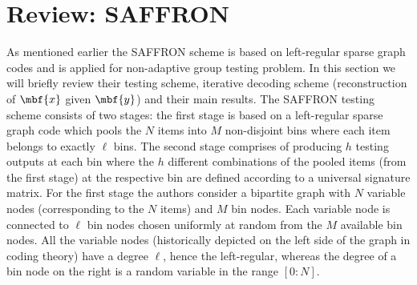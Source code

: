 \documentclass[conference,twocolumn]{IEEEtran}
\DeclareMathOperator*{\bigORtxt}{\scalerel*{\text{$\vee$}}{\textstyle\sum}}
\begin{document}
%

\section{Review: SAFFRON}
\label{Sec:PriorWork}
As mentioned earlier the SAFFRON scheme \cite{lee2015saffron} is based on left-regular sparse graph codes and is applied for non-adaptive group testing problem. In this section we will briefly review their testing scheme, iterative decoding scheme (reconstruction of $\mbf{x}$ given $\mbf{y}$) and their main results. The SAFFRON testing scheme consists of two stages: the first stage is based on a left-regular sparse graph code which pools the $N$ items into $M$ non-disjoint bins where each item belongs to exactly $\ell$ bins. The second stage comprises of producing $h$ testing outputs at each bin where the $h$ different combinations of the pooled items (from the first stage) at the respective bin are defined according to a universal signature matrix. For the first stage the authors consider a bipartite graph with $N$ variable nodes (corresponding to the $N$ items) and $M$ bin nodes. Each variable node is connected to $\ell$ bin nodes chosen uniformly at random from the $M$ available bin nodes. All the variable nodes (historically depicted on the left side of the graph in coding theory) have a degree $\ell$, hence the left-regular, whereas the degree of a bin node on the right is a random variable in the range $[0:N]$.
\end{document}
